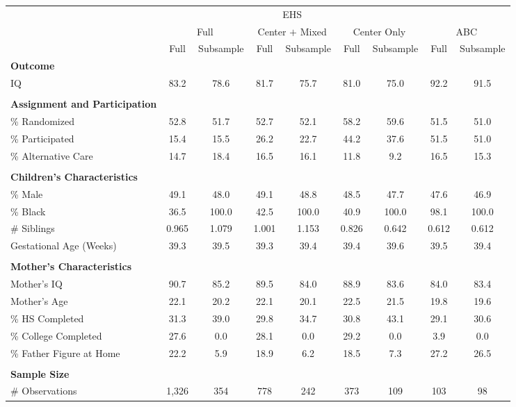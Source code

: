 \begin{tabular}{lcccccccc}
\toprule 
\midrule 
 & \multicolumn{6}{c}{EHS} & \multicolumn{2}{c}{} \\
 \cmidrule(lr){2-7} \cmidrule(lr){8-9} 
 & \multicolumn{2}{c}{Full} & \multicolumn{2}{c}{Center $+$ Mixed} & \multicolumn{2}{c}{Center Only} & \multicolumn{2}{c}{ABC} \\
 \cmidrule(lr){2-3} \cmidrule(lr){4-5} \cmidrule(lr){6-7} \cmidrule(lr){8-9} 
 & Full & Subsample & Full & Subsample & Full & Subsample & Full & Subsample \\
\midrule 
\textbf{Outcome} \\
\quad IQ & 83.2 & 78.6 & 81.7 & 75.7 & 81.0 & 75.0 & 92.2 & 91.5 \\
 \\
\textbf{Assignment and Participation} \\
\quad \% Randomized & 52.8 & 51.7 & 52.7 & 52.1 & 58.2 & 59.6 & 51.5 & 51.0 \\
\quad \% Participated & 15.4 & 15.5 & 26.2 & 22.7 & 44.2 & 37.6 & 51.5 & 51.0 \\
\quad \% Alternative Care & 14.7 & 18.4 & 16.5 & 16.1 & 11.8 & 9.2 & 16.5 & 15.3 \\
 \\
\textbf{Children's Characteristics} \\
\quad \% Male & 49.1 & 48.0 & 49.1 & 48.8 & 48.5 & 47.7 & 47.6 & 46.9 \\
\quad \% Black & 36.5 & 100.0 & 42.5 & 100.0 & 40.9 & 100.0 & 98.1 & 100.0 \\
\quad \# Siblings & 0.965 & 1.079 & 1.001 & 1.153 & 0.826 & 0.642 & 0.612 & 0.612 \\
\quad Gestational Age (Weeks) & 39.3 & 39.5 & 39.3 & 39.4 & 39.4 & 39.6 & 39.5 & 39.4 \\
 \\
\textbf{Mother's Characteristics} \\
\quad Mother's IQ & 90.7 & 85.2 & 89.5 & 84.0 & 88.9 & 83.6 & 84.0 & 83.4 \\
\quad Mother's Age & 22.1 & 20.2 & 22.1 & 20.1 & 22.5 & 21.5 & 19.8 & 19.6 \\
\quad \% HS Completed & 31.3 & 39.0 & 29.8 & 34.7 & 30.8 & 43.1 & 29.1 & 30.6 \\
\quad \% College Completed & 27.6 & 0.0 & 28.1 & 0.0 & 29.2 & 0.0 & 3.9 & 0.0 \\
\quad \% Father Figure at Home & 22.2 & 5.9 & 18.9 & 6.2 & 18.5 & 7.3 & 27.2 & 26.5 \\
 \\
\textbf{Sample Size} \\
\quad \# Observations & 1,326 & 354 & 778 & 242 & 373 & 109 & 103 & 98 \\
\midrule 
\bottomrule 
\end{tabular}
